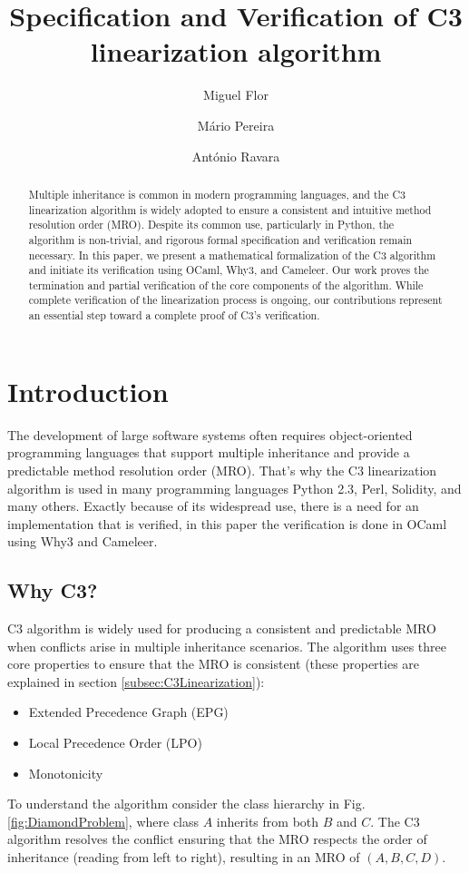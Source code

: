 \documentclass[runningheads]{llncs}
\title{Specification and Verification of C3 linearization algorithm}
\author{
  Miguel Flor \and Mário Pereira \and António Ravara
}
\institute{
  NOVA LINCS, Nova School of Science and Technology \\
  \email{m.flor@campus.fct.unl.pt}, \email{\{mjp.pereira, aravara\}@fct.unl.pt}
}
\begin{document}
\maketitle

\begin{abstract}
Multiple inheritance is common in modern programming languages,
 and the C3 linearization algorithm is widely adopted to ensure a consistent and intuitive method resolution order (MRO). Despite its common use, particularly in Python, the algorithm is non-trivial, and rigorous formal specification and verification remain necessary.
In this paper, we present a mathematical formalization of the C3 algorithm and initiate its verification using OCaml, Why3, and Cameleer. Our work proves the termination and partial verification of the core components of the algorithm.
While complete verification of the linearization process is ongoing, our contributions represent an essential step toward a complete proof of C3's verification.

     
\end{abstract}
\section{Introduction}
The development of large software systems often requires object-oriented programming languages that support multiple inheritance and provide a predictable method resolution order (MRO). 
 That's why the C3 linearization algorithm is used in many programming languages Python 2.3\autocite{Python23Method}, Perl\autocite{MroMethodResolution}, Solidity\autocite{LanguageInfluencesSolidity}, and many others.
 Exactly because of its widespread use, there is a need for an implementation that is verified, in this paper the verification is done in OCaml using Why3 and Cameleer.

\subsection{Why C3?}
C3 algorithm is widely used for producing a consistent and predictable MRO when conflicts arise in multiple inheritance scenarios.
The algorithm uses three core properties to ensure that the MRO is consistent (these properties are explained in section \ref{subsec:C3Linearization}):
\begin{itemize}
    \item Extended Precedence Graph (EPG)
    \item Local Precedence Order (LPO)
    \item Monotonicity
\end{itemize}
To understand the algorithm consider the class hierarchy in Fig. \ref{fig:DiamondProblem}, where class $A$ inherits from both $B$ and $C$. The C3 algorithm resolves the conflict ensuring that the MRO respects the order of inheritance (reading from left to right), resulting in an MRO of $(A, B, C, D)$.
\end{document}
